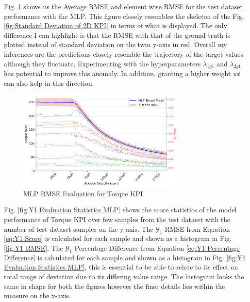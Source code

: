 \documentclass{report} %
\begin{document}
Fig. \ref{fig:MLP RMSE Evaluation for 2D KPI(Torque)} shows us the Average \ac{RMSE} and element wise \ac{RMSE} for the test dataset performance with the \ac{MLP}. 
This figure closely resembles the skeleton of the Fig. \ref{fig:Standard Deviation of 2D KPI} in terms of what is displayed. The only difference I can highlight is 
that the \ac{RMSE} with that of the ground truth is plotted instead of standard deviation on the twin y-axis in red.
Overall my inferences are the predictions closely resemble the trajectory of the target values although they fluctuate. Experimenting with the hyperparameters 
\textit{$\lambda_{1y1}$} and \textit{$\lambda_{2y1}$} has potential to improve this anomaly. In addition, granting a higher weight \textit{wt} can also help in this direction.

\begin{figure}[H]
    \centering
    \includegraphics[width=0.75\textwidth]{./ReportImages/RMSE_MLP_y1.png} 
    \caption{\ac{MLP} \ac{RMSE} Evaluation for Torque \ac{KPI}} 
    \label{fig:MLP RMSE Evaluation for 2D KPI(Torque)}
\end{figure}

Fig. \ref{fig:Y1 Evaluation Statistics MLP} shows the score statistics of the model performance of Torque \ac{KPI} over few samples from the test dataset 
with the number of test dataset samples on the y-axis.
The $\mathcal{Y}_1$ \ac{RMSE} from Equation \ref{eq:Y1 Score} is calculated for each sample and shown as a histogram in Fig. \ref{fig:Y1 RMSE}.
The $\mathcal{Y}_1$ Percentage Difference from Equation \ref{eq:Y1 Percentage Difference} is calculated for each sample and shown as a histogram in Fig. 
\ref{fig:Y1 Evaluation Statistics MLP}, this is essential to be able to relate to its effect on total range of deviation due to its differing value range. 
The histogram looks the same in shape for both the figures however the finer details lies within the measure on the x-axis.
\end{document}
